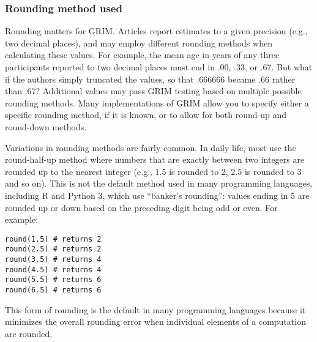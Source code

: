\documentclass[letterpaper, 12pt]{article}
\begin{document}
\subsubsection*{Rounding method used}

Rounding matters for GRIM. Articles report estimates to a given precision (e.g., two decimal places), and may employ different rounding methods when calculating these values. For example, the mean age in years of any three participants reported to two decimal places must end in .00, .33, or .67. But what if the authors simply truncated the values, so that .666666 became .66 rather than .67? Additional values may pass GRIM testing based on multiple possible rounding methods. Many implementations of GRIM allow you to specify either a specific rounding method, if it is known, or to allow for both round-up and round-down methods. 

Variations in rounding methods are fairly common. In daily life, most use the round-half-up method where numbers that are exactly between two integers are rounded up to the nearest integer (e.g., 1.5 is rounded to 2, 2.5 is rounded to 3 and so on). This is not the default method used in many programming languages, including R and Python 3, which use ``banker's rounding'': values ending in 5 are rounded up or down based on the preceding digit being odd or even. For example:
\begin{verbatim}
round(1.5) # returns 2
round(2.5) # returns 2
round(3.5) # returns 4
round(4.5) # returns 4
round(5.5) # returns 6
round(6.5) # returns 6
\end{verbatim}
This form of rounding is the default in many programming languages because it minimizes the overall rounding error when individual elements of a computation are rounded.
\end{document}
